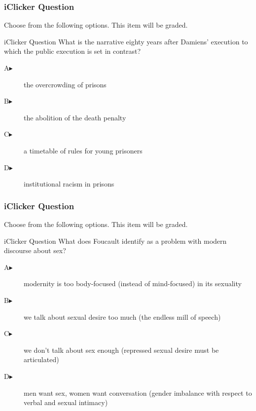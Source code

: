 \documentclass[xcolor=dvipsnames]{beamer}
\begin{document}
\begin{frame}
  \frametitle{iClicker Question}
Choose from the following options. This item will be graded.
\begin{block}{iClicker Question}
What is the narrative eighty years after Damiens' execution to which
the public execution is set in contrast?
\end{block}
\begin{description}
\item[A\hspace{.2in}$\blacktriangleright$] the overcrowding of prisons
\item[B\hspace{.2in}$\blacktriangleright$] the abolition of the death penalty
\item[C\hspace{.2in}$\blacktriangleright$] a timetable of rules for young prisoners
\item[D\hspace{.2in}$\blacktriangleright$] institutional racism in prisons
\end{description}
\end{frame}

\begin{frame}
  \frametitle{iClicker Question}
Choose from the following options. This item will be graded.
\begin{block}{iClicker Question}
What does Foucault identify as a problem with modern discourse about sex?
\end{block}
\begin{description}
\item[A\hspace{.2in}$\blacktriangleright$] modernity is too
  body-focused (instead of mind-focused) in its sexuality
\item[B\hspace{.2in}$\blacktriangleright$] we talk about sexual desire too much
  (the endless mill of speech)
\item[C\hspace{.2in}$\blacktriangleright$] we don't talk about sex
  enough (repressed sexual desire must be articulated)
\item[D\hspace{.2in}$\blacktriangleright$] men want sex, women want
  conversation (gender imbalance with respect to verbal and sexual
  intimacy)
\end{description}
\end{frame}
\end{document}
